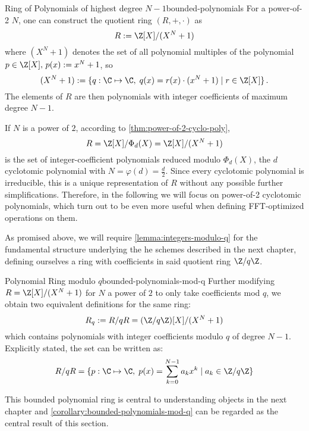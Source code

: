 \begin{definition}{Ring of Polynomials of highest degree $N-1$}{bounded-polynomials}
  For a power-of-2 $N$, one can construct the quotient ring $(R, +, \cdot)$ as
  $$R := \Z[X] / (X^N + 1)$$
  where $(X^N + 1)$ denotes the set of all polynomial multiples of the polynomial $p \in \Z[X],\, p(x) := x^N + 1$, so
  $$(X^N+1) := \{q: \C \mapsto \C,\; q(x) = r(x) \cdot (x^N+1) \;|\; r \in \Z[X]\} \,.$$
  The elements of $R$ are then polynomials with integer coefficients of maximum degree $N-1$.
\end{definition}

If $N$ is a power of $2$, according to \cref{thm:power-of-2-cyclo-poly}, $$R = \Z[X] / \Phi_d(X) = \Z[X] / (X^N + 1)$$ is the set of integer-coefficient polynomials reduced modulo $\Phi_d(X)$, the $d$\th cyclotomic polynomial with $N = \varphi(d) = \frac{d}{2}$.
Since every cyclotomic polynomial is irreducible, this is a unique representation of $R$ without any possible further simplifications.
Therefore, in the following we will focus on power-of-2 cyclotomic polynomials, which turn out to be even more useful when defining FFT-optimized operations on them.

As promised above, we will require \cref{lemma:integers-modulo-q} for the fundamental structure underlying the \gls{he} schemes described in the next chapter, defining ourselves a ring with coefficients in said quotient ring $\Z/q\Z$.

\begin{corollary}{Polynomial Ring modulo $q$}{bounded-polynomials-mod-q}
  Further modifying $R = \Z[X] / (X^N+1)$ for $N$ a power of $2$ to only take coefficients mod $q$, we obtain two equivalent definitions for the same ring:
  $$R_q := R/qR = (\Z/q\Z)[X] / (X^N+1)$$
  which contains polynomials with integer coefficients modulo $q$ of degree $N-1$.
  Explicitly stated, the set can be written as:
  $$R/qR = \{p: \C \mapsto \C,\; p(x) = \sum_{k=0}^{N-1} a_k x^k \;|\; a_k \in \Z/q\Z\}$$
\end{corollary}

This bounded polynomial ring is central to understanding objects in the next chapter and \cref{corollary:bounded-polynomials-mod-q} can be regarded as the central result of this section.

\pagebreak
